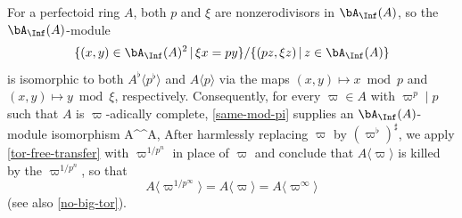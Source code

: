 






For a perfectoid ring $A$, both $p$ and $\xi$ are nonzerodivisors in $\bA_\Inf(A)$, so the $\bA_\Inf(A)$-module
\[
\{(x, y) \in \bA_\Inf(A)^2 \, \vert\, \xi x = p y \}/ \{(pz, \xi z)\, \vert\, z \in \bA_\Inf(A)\}
\]
is isomorphic to both $A^\flat\langle p^\flat\rangle$ and $A\langle p\rangle$
via the maps $(x, y) \mapsto x \bmod p$ and $(x, y) \mapsto y \bmod \xi$, respectively. Consequently, for every $\varpi \in A$ with $\varpi^p \mid p$ such that $A$ is $\varpi$-adically complete, \eqref{same-mod-pi} supplies an $\bA_\Inf(A)$-module isomorphism
\be \label{tor-free-transfer}
A^\flat\langle \varpi^\flat\rangle \cong A\langle\varpi\rangle, 
\ee
After harmlessly replacing $\varpi$ by $(\varpi^\flat)^\sharp$, we apply \eqref{tor-free-transfer} with $\varpi^{1/p^n}$ in place of $\varpi$ and conclude that $A\langle \varpi \rangle$ is killed by the $\varpi^{1/p^n}$, so that
\[
A\langle \varpi^{1/p^\infty}\rangle = A\langle \varpi \rangle = A\langle \varpi^\infty \rangle
\]
(see also \eqref{no-big-tor}).

